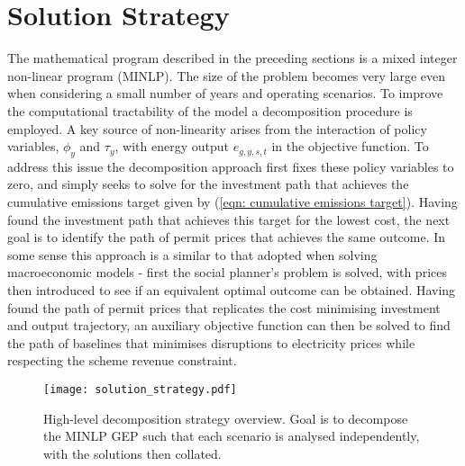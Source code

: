 \documentclass{article}
\newcommand{\sGeneratorsExistingThermal}{G^{\mathrm{E,T}}}
\newcommand{\sGeneratorsCandidate}{G^{\mathrm{C}}}
\newcommand{\sYears}{Y}
\newcommand{\sScenarios}{S}
\newcommand{\sIntervals}{T}
\newcommand{\iGenerator}{g}
\newcommand{\iYear}{y}
\newcommand{\iScenario}{s}
\newcommand{\iInterval}{t}
\newcommand{\cScenarioDuration}[1][\iYear,\iScenario]{\rho_{#1}}
\newcommand{\cEmissionsIntensity}[1][\iGenerator]{E_{#1}}
\newcommand{\cSchemeRevenueCumulativeTarget}{\overline{R}}
\newcommand{\vBaseline}[1][\iYear]{\phi_{#1}}
\newcommand{\vPermitPrice}[1][\iYear]{\tau_{#1}}
\newcommand{\vEnergy}[1][\iGenerator,\iYear,\iScenario,\iInterval]{e_{#1}}
\begin{document}
%


\section{Solution Strategy}
The mathematical program described in the preceding sections is a mixed integer non-linear program (MINLP). The size of the problem becomes very large even when considering a small number of years and operating scenarios. To improve the computational tractability of the model a decomposition procedure is employed. A key source of non-linearity arises from the interaction of policy variables, $\vBaseline$ and $\vPermitPrice$, with energy output $\vEnergy$ in the objective function. To address this issue the decomposition approach first fixes these policy variables to zero, and simply seeks to solve for the investment path that achieves the cumulative emissions target given by (\ref{eqn: cumulative emissions target}). Having found the investment path that achieves this target for the lowest cost, the next goal is to identify the path of permit prices that achieves the same outcome. In some sense this approach is a similar to that adopted when solving macroeconomic models - first the social planner's problem is solved, with prices then introduced to see if an equivalent optimal outcome can be obtained. Having found the path of permit prices that replicates the cost minimising investment and output trajectory, an auxiliary objective function can then be solved to find the path of baselines that minimises disruptions to electricity prices while respecting the scheme revenue constraint.

\begin{figure}
	\texttt{[image: solution\_strategy.pdf]}
	\caption{High-level decomposition strategy overview. Goal is to decompose the MINLP GEP such that each scenario is analysed independently, with the solutions then collated.}
\end{figure}
\end{document}
